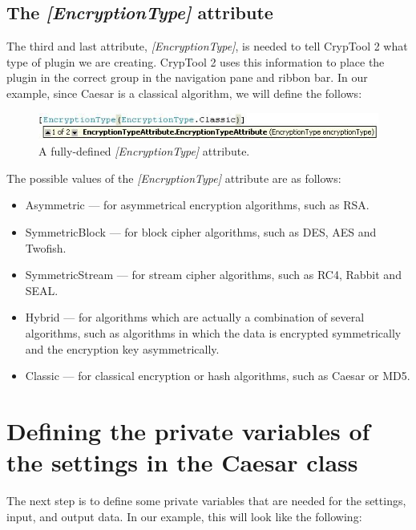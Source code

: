 \subsection{The \protect\textit{[EncryptionType]} attribute}
\label{sec:TheEncryptionTypeAttribute}

The third and last attribute, \textit{[EncryptionType]}, is needed to tell CrypTool 2 what type of plugin we are creating. CrypTool 2 uses this information to place the plugin in the correct group in the navigation pane and ribbon bar. In our example, since Caesar is a classical algorithm, we will define the follows:

\begin{figure}[h]
	\centering
		\includegraphics[width=.90\textwidth]{figures/attribute_encryptiontype_new.jpg}
	\caption{A fully-defined \textit{[EncryptionType]} attribute.}
	\label{fig:attribute_encryption_type}
\end{figure}

The possible values of the \textit{[EncryptionType]} attribute are as follows:

\begin{itemize}
	\item Asymmetric --- for asymmetrical encryption algorithms, such as RSA.
	\item SymmetricBlock --- for block cipher algorithms, such as DES, AES and Twofish.
	\item SymmetricStream --- for stream cipher algorithms, such as RC4, Rabbit and SEAL.
	\item Hybrid --- for algorithms which are actually a combination of several algorithms, such as algorithms in which the data is encrypted symmetrically and the encryption key asymmetrically.
	\item Classic --- for classical encryption or hash algorithms, such as Caesar or MD5.
\end{itemize}

\section{Defining the private variables of the settings in the Caesar class}
\label{sec:DefiningThePrivateVariablesOfTheSettingsInTheCaesarClass}

The next step is to define some private variables that are needed for the settings, input, and output data. In our example, this will look like the following:

